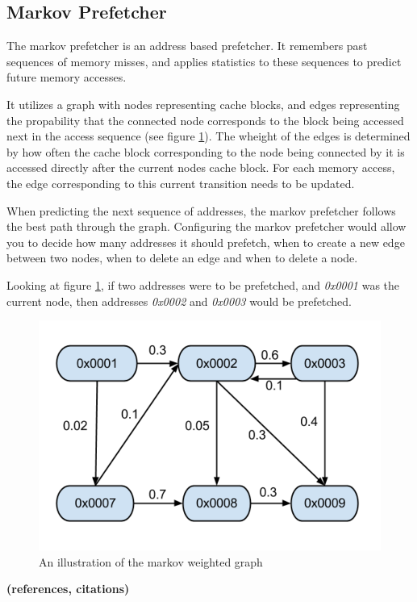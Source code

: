 \subsection{Markov Prefetcher}
\label{sec:markovPrefetcher}
The markov prefetcher is an address based prefetcher. It remembers past sequences of memory misses, and applies statistics to these sequences to predict future memory accesses.

It utilizes a graph with nodes representing cache blocks, and edges representing the propability that the connected node corresponds to the block being accessed next in the access sequence (see figure \ref{fig:markov}). The wheight of the edges is determined by how often the cache block corresponding to the node being connected by it is accessed directly after the current nodes cache block. For each memory access, the edge corresponding to this current transition needs to be updated. 

When predicting the next sequence of addresses, the markov prefetcher follows the best path through the graph. Configuring the markov prefetcher would allow you to decide how many addresses it should prefetch, when to create a new edge between two nodes, when to delete an edge and when to delete a node.

Looking at figure \ref{fig:markov}, if two addresses were to be prefetched, and \emph{0x0001} was the current node, then addresses \emph{0x0002} and \emph{0x0003} would be prefetched.

\begin{figure}[H]
\label{fig:markov}
\includegraphics[scale=0.5]{./figures/markov}
\caption{An illustration of the markov weighted graph}
\end{figure}
{\bf (references, citations)}
